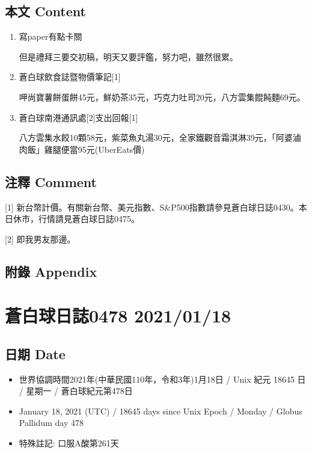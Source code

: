 \documentclass[a5paper, 11pt
]{book}
\providecommand{\tightlist}{%
  \setlength{\itemsep}{0pt}\setlength{\parskip}{0pt}}
\begin{document}
\hypertarget{ux672cux6587-content-47}{%
\subsection{本文 Content}\label{ux672cux6587-content-47}}

\begin{enumerate}
\def\labelenumi{\arabic{enumi}.}
\item
  寫paper有點卡關

  但是禮拜三要交初稿，明天又要評鑑，努力吧，雖然很累。
\item
  蒼白球飲食誌暨物價筆記{[}1{]}

  呷尚寶薯餅蛋餅45元，鮮奶茶35元，巧克力吐司20元，八方雲集餛飩麵69元。
\item
  蒼白球南港通訊處{[}2{]}支出回報{[}1{]}

  八方雲集水餃10顆58元，紫菜魚丸湯30元，全家鐵觀音霜淇淋39元，「阿婆滷肉飯」雞腿便當95元(UberEats價)
\end{enumerate}

\hypertarget{ux6ce8ux91cb-comment-47}{%
\subsection{注釋 Comment}\label{ux6ce8ux91cb-comment-47}}

{[}1{]}
新台幣計價。有關新台幣、美元指數、S\&P500指數請參見蒼白球日誌0430。本日休市，行情請見蒼白球日誌0475。

{[}2{]} 即我男友那邊。

\hypertarget{ux9644ux9304-appendix-47}{%
\subsection{附錄 Appendix}\label{ux9644ux9304-appendix-47}}

\hypertarget{ux84bcux767dux7403ux65e5ux8a8c0478-20210118}{%
\section{蒼白球日誌0478
2021/01/18}\label{ux84bcux767dux7403ux65e5ux8a8c0478-20210118}}

\hypertarget{ux65e5ux671f-date-48}{%
\subsection{日期 Date}\label{ux65e5ux671f-date-48}}

\begin{itemize}
\tightlist
\item
  世界協調時間2021年(中華民國110年，令和3年)1月18日 / Unix 紀元 18645 日
  / 星期一 / 蒼白球紀元第478日
\item
  January 18, 2021 (UTC) / 18645 days since Unix Epoch / Monday / Globus
  Pallidum day 478
\item
  特殊註記: 口服A酸第261天
\end{itemize}
\end{document}
